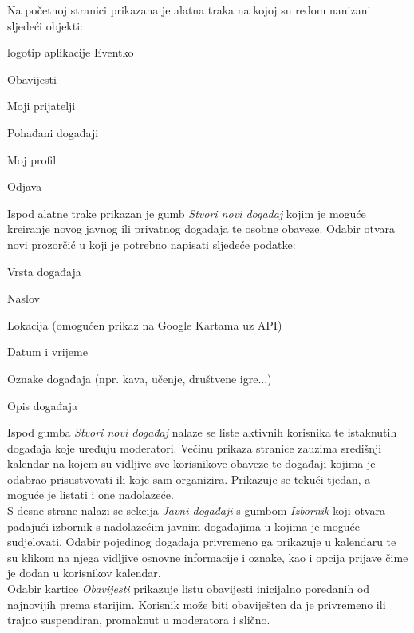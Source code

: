 		\indent Na početnoj stranici prikazana je alatna traka na kojoj su redom nanizani sljedeći objekti:
		
		\begin{packed_item}
			\item logotip aplikacije Eventko
			\item Obavijesti
			\item Moji prijatelji
			\item Pohađani događaji
			\item Moj profil
			\item Odjava
		\end{packed_item}
	
		\indent Ispod alatne trake prikazan je gumb \textit{Stvori novi događaj} kojim je moguće kreiranje novog javnog ili privatnog događaja te osobne obaveze. Odabir otvara novi prozorčić u koji je potrebno napisati sljedeće podatke:
		
		\begin{packed_item}
			\item Vrsta događaja
			\item Naslov
			\item Lokacija (omogućen prikaz na Google Kartama uz API)
			\item Datum i vrijeme
			\item Oznake događaja (npr. kava, učenje, društvene igre...)
			\item Opis događaja
		\end{packed_item}
	
		\indent Ispod gumba \textit{Stvori novi događaj} nalaze se liste aktivnih korisnika te istaknutih događaja koje uređuju moderatori. Većinu prikaza stranice zauzima središnji kalendar na kojem su vidljive sve korisnikove obaveze te događaji kojima je odabrao prisustvovati ili koje sam organizira. Prikazuje se tekući tjedan, a moguće je listati i one nadolazeće. \\
		
		\indent S desne strane nalazi se sekcija \textit{Javni događaji} s gumbom \textit{Izbornik} koji otvara padajući izbornik s nadolazećim javnim događajima u kojima je moguće sudjelovati. Odabir pojedinog događaja privremeno ga prikazuje u kalendaru te su klikom na njega vidljive osnovne informacije i oznake, kao i opcija prijave čime je dodan u korisnikov kalendar. \\
		
		\indent Odabir kartice \textit{Obavijesti} prikazuje listu obavijesti inicijalno poredanih od najnovijih prema starijim. Korisnik može biti obaviješten da je privremeno ili trajno suspendiran, promaknut u moderatora i slično.
		\eject
		
